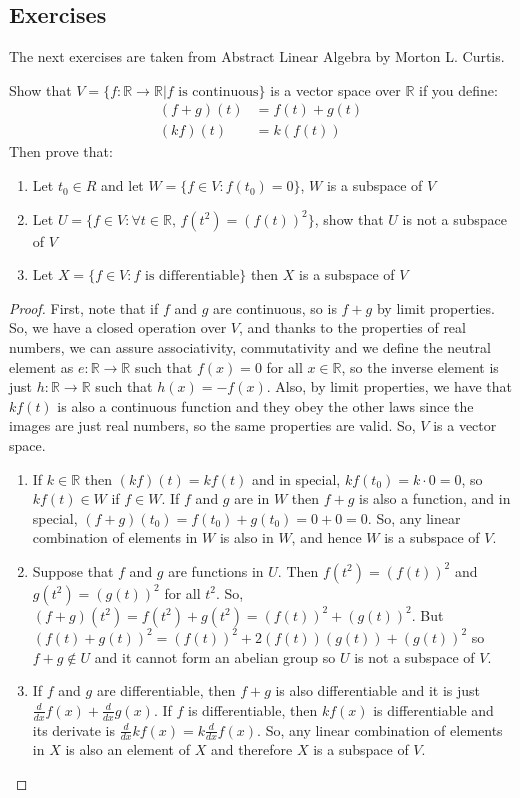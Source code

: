 \documentclass{tufte-handout}
\begin{document}
\subsection{Exercises}
The next exercises are taken from Abstract Linear Algebra by Morton L. Curtis.

\begin{problem}
	Show that $V = \{f: \mathbb{R} \to \mathbb{R} | f \text{ is continuous}\}$ is a vector space over $\mathbb{R}$ if you define:
	\begin{align*}
		(f + g)(t) &= f(t) + g(t)\\
		(kf)(t) &= k(f(t))
	\end{align*}
	Then prove that:
	\begin{enumerate}
		\item Let $t_0 \in R$ and let $W = \{f \in V: f(t_0) = 0\}$, $W$ is a subspace of $V$
		\item Let $U = \{f \in V: \forall t \in \mathbb{R}, \, f(t^2) = (f(t))^2\}$, show that $U$ is not a subspace of $V$
		\item Let $X = \{f \in V: f \text{ is differentiable}\}$ then $X$ is a subspace of $V$
	\end{enumerate}
\end{problem}
\begin{proof}
	First, note that if $f$ and $g$ are continuous, so is $f + g$ by limit properties. So, we have a closed operation over $V$, and thanks to the properties of real numbers, we can assure associativity, commutativity and we define the neutral element as $e: \mathbb{R} \to \mathbb{R}$ such that $f(x) = 0$ for all $x \in \mathbb{R}$, so the inverse element is just $h: \mathbb{R} \to \mathbb{R}$ such that $h(x) = -f(x)$. Also, by limit properties, we have that $kf(t)$ is also a continuous function and they obey the other laws since the images are just real numbers, so the same properties are valid. So, $V$ is a vector space.
	\begin{enumerate}
		\item If $k \in \mathbb{R}$ then $(kf)(t) = kf(t)$ and in special, $kf(t_0) = k\cdot 0 = 0$, so $kf(t) \in W$ if $f \in W$. If $f$ and $g$ are in $W$ then $f+g$ is also a function, and in special, $(f+g)(t_0) = f(t_0) + g(t_0) = 0+0 =0$. So, any linear combination of elements in $W$ is also in $W$, and hence $W$ is a subspace of $V$.
		\item Suppose that $f$ and $g$ are functions in $U$. Then $f(t^2) = (f(t))^2$ and $g(t^2) = (g(t))^2$ for all $t^2$. So, $(f+g)(t^2) = f(t^2) + g(t^2) = (f(t))^2 + (g(t))^2$. But $(f(t) + g(t))^2 =  (f(t))^2 + 2 (f(t))(g(t)) + (g(t))^2$ so $f+g \not \in U$ and it cannot form an abelian group so $U$ is not a subspace of $V$.
		\item If $f$ and $g$ are differentiable, then $f+g$ is also differentiable and it is just $\frac{d}{dx} f(x) + \frac{d}{dx} g(x)$. If $f$ is differentiable, then $kf(x)$ is differentiable and its derivate is $\frac{d}{dx} kf(x) = k\frac{d}{dx} f(x)$. So, any linear combination of elements in $X$ is also an element of $X$ and therefore $X$ is a subspace of $V$.
	\end{enumerate} 
\end{proof}
\end{document}
